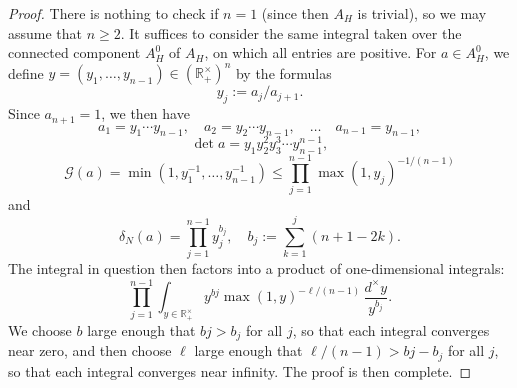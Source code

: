 \begin{proof}
  There is nothing to check if $n = 1$ (since then $A_H$ is trivial), so we may assume that $n \geq 2$.  It suffices to consider the same integral taken over the connected component $A_H^0$ of $A_H$, on which all entries are positive.  For $a \in A_H^0$, we define $y = (y_1,\dotsc,y_{n-1}) \in (\mathbb{R}^\times_+)^n$ by the formulas
  \begin{equation*}
    y_j := a_j / a_{j+1}.
  \end{equation*}
  Since $a_{n + 1} = 1$, we then have
  \begin{equation*}
    a_1 = y_1 \dotsb y_{n-1},
    \quad
    a_2 = y_2 \dotsb y_{n-1},
    \quad
    \dotsc
    \quad
    a_{n-1} = y_{n-1},
  \end{equation*}
  \begin{equation*}
    \det a = y_1 y_2^2 y_3^3 \dotsb y_{n-1}^{n-1},
  \end{equation*}
  \begin{equation*}
    \mathcal{G}(a) =
    \min(1,y_1^{-1},\dotsc,y_{n-1}^{-1})
    \leq
    \prod_{j=1}^{n-1} \max(1, y_j)^{-1/(n-1)}
  \end{equation*}
  and
  \begin{equation*}
    \delta_N(a) =  \prod_{j=1}^{n-1} y_j^{b_j}, \quad
    b_j := \sum_{k=1}^{j} (n + 1 - 2 k).
  \end{equation*}
  The integral in question then factors into a product of one-dimensional integrals:
  \begin{equation*}
    \prod_{j=1}^{n-1}
    \int_{y \in \mathbb{R}^\times_+}
    y^{b j} \max(1, y)^{-\ell/(n-1)}
    \, \frac{d^\times y}{y^{b_j}}.
  \end{equation*}
  We choose $b$ large enough that $b j > b_j$ for all $j$, so that each integral converges near zero, and then choose $\ell$ large enough that $\ell/(n-1) > b j - b_j$ for all $j$, so that each integral converges near infinity.  The proof is then complete.
\end{proof}

